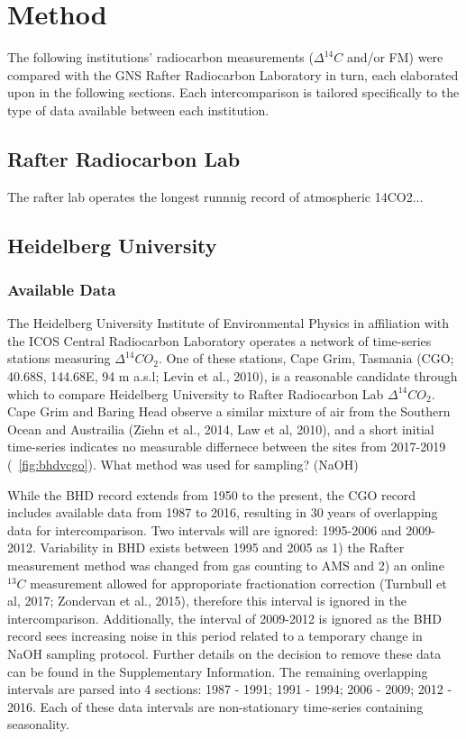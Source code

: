 \section{Method}
\label{sec:method}


The following institutions' radiocarbon measurements (${\Delta^{14}C}$ and/or FM) 
 were compared with the GNS Rafter Radiocarbon Laboratory in turn, each elaborated upon in the following sections. Each intercomparison is tailored specifically to the type of data available between each institution. 

\subsection{Rafter Radiocarbon Lab}

The rafter lab operates the longest runnnig record of atmospheric 14CO2...

\subsection{Heidelberg University}
\subsubsection{Available Data}

The Heidelberg University Institute of Environmental Physics in affiliation with the ICOS Central Radiocarbon Laboratory operates a network of time-series stations measuring ${\Delta^{14}CO_{2}}$. One of these stations, Cape Grim, Tasmania (CGO; 40.68S, 144.68E, 94 m a.s.l; Levin et al., 2010), is a reasonable candidate through which to compare Heidelberg University to Rafter Radiocarbon Lab ${\Delta^{14}CO_{2}}$. Cape Grim and Baring Head observe a similar mixture of air from the Southern Ocean and Austrailia (Ziehn et al., 2014, Law et al, 2010), and a short initial time-series indicates no measurable differnece between the sites from 2017-2019 (~\ref{fig:bhdvcgo}). 
What method was used for sampling? (NaOH)


While the BHD record extends from 1950 to the present, the CGO record includes available data from 1987 to 2016, resulting in 30 years of overlapping data for intercomparison. 
Two intervals will are ignored: 1995-2006 and 2009-2012.
Variability in BHD exists between 1995 and 2005 as 1) the Rafter measurement method was changed from gas counting to AMS and 2) an online $^{13}C$ measurement allowed for approporiate fractionation correction (Turnbull et al, 2017; Zondervan et al., 2015), therefore this interval is ignored in the intercomparison. 
Additionally, the interval of 2009-2012 is ignored as the BHD record sees increasing noise in this period related to a temporary change in NaOH sampling protocol. Further details on the decision to remove these data can be found in the Supplementary Information. 
The remaining overlapping intervals are parsed into 4 sections: 1987 - 1991; 1991 - 1994; 2006 - 2009; 2012 - 2016. 
Each of these data intervals are non-stationary time-series containing seasonality. 

